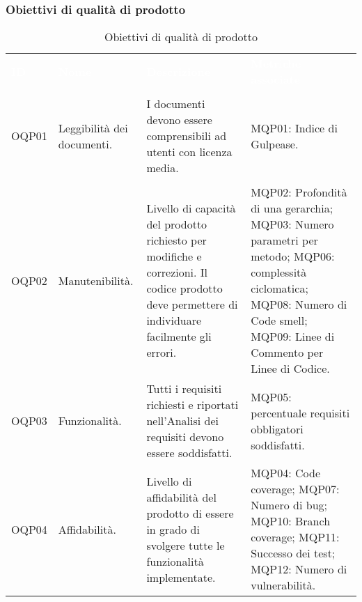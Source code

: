 \subsubsection{Obiettivi di qualità di prodotto}

\begin{table}[H]
    \renewcommand{\arraystretch}{1.5}
    \begin{tabular}{ m{}<{\centering}  m{}<{\centering}  m{}<{\centering}  m{}<{\centering} }
        \rowcolor{darkblue}
        \textcolor{white}{\textbf{ID}} &\textcolor{white}{\textbf{Nome}}& \textcolor{white}{\textbf{Descrizione}} & \textcolor{white}{\textbf{Metriche associate}}\\ 
        
        \rowcolor{gray!75}
        \multicolumn{4}{c}{\textbf{Documenti}}\\

        OQP01 &
        Leggibilità dei documenti. &
        I documenti devono essere comprensibili ad utenti con licenza media. &
        MQP01: Indice di Gulpease. \\

        \rowcolor{gray!75}
        \multicolumn{4}{c}{\textbf{Software}}\\

        OQP02 &
        Manutenibilità. &
        Livello di capacità del prodotto richiesto per modifiche e correzioni. Il codice prodotto deve permettere di individuare facilmente gli errori. &
        MQP02: Profondità di una gerarchia; \newline
        MQP03: Numero parametri per metodo; \newline
        MQP06: complessità ciclomatica; \newline
        MQP08: Numero di Code smell; \newline
        MQP09: Linee di Commento per Linee di Codice. \\

        \rowcolor{gray!25}
        OQP03 &
        Funzionalità. &
        Tutti i requisiti richiesti e riportati nell'Analisi dei requisiti devono essere soddisfatti. &
        MQP05: percentuale requisiti obbligatori soddisfatti. \\

        OQP04 &
        Affidabilità. &
        Livello di affidabilità del prodotto di essere in grado di svolgere tutte le funzionalità implementate. &
        MQP04: Code coverage; \newline
        MQP07: Numero di bug; \newline
        MQP10: Branch coverage; \newline
        MQP11: Successo dei test; \newline
        MQP12: Numero di vulnerabilità. \\

    \end{tabular}
    \caption{Obiettivi di qualità di prodotto}
\end{table}

